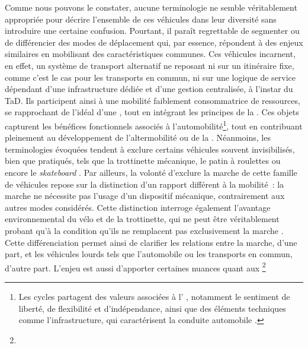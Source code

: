 \begin{refsegment}
Comme nous pouvons le constater, aucune terminologie ne semble véritablement appropriée pour décrire l’ensemble de ces véhicules dans leur diversité sans introduire une certaine confusion. Pourtant, il paraît regrettable de segmenter ou de différencier des modes de déplacement qui, par essence, répondent à des enjeux similaires en mobilisant des caractéristiques communes. Ces véhicules incarnent, en effet, un système de transport alternatif ne reposant ni sur un itinéraire fixe, comme c’est le cas pour les transports en commun, ni sur une logique de service dépendant d’une infrastructure dédiée et d’une gestion centralisée, à l’instar du \acrfull{TaD}. Ils participent ainsi à une mobilité faiblement consommatrice de ressources, se rapprochant de l’idéal d’une  \textcolor{blue}{\autocite[5]{itdp_electric_2019}}, tout en intégrant les principes de la . Ces objets capturent les bénéfices fonctionnels associés à l’automobilité\footnote{
        Les cycles partagent des valeurs associées à l' \textcolor{blue}{\autocites[57-58]{urry_sociology_2000}[28]{urry_system_2004}}, notamment le sentiment de liberté, de flexibilité et d'indépendance, ainsi que des éléments techniques comme l'infrastructure, qui caractérisent la conduite automobile \textcolor{blue}{\autocite[12]{heran_reduction_2001}}.
}, tout en contribuant pleinement au développement de l’altermobilité ou de la  \textcolor{blue}{\autocites[25]{amar_homo_2016}{heran_transition_2018}}. Néanmoins, les terminologies évoquées tendent à exclure certains véhicules souvent invisibilisés, bien que pratiqués, tels que la trottinette mécanique, le patin à roulettes ou encore le \textsl{skateboard} \textcolor{blue}{\autocite[19]{sebban_complementarite_2003}}. Par ailleurs, la volonté d’exclure la marche de cette famille de véhicules repose sur la distinction d’un rapport différent à la mobilité~: la marche ne nécessite pas l’usage d’un dispositif mécanique, contrairement aux autres modes considérés. Cette distinction interroge également l’avantage environnemental du vélo et de la trottinette, qui ne peut être véritablement probant qu'à la condition qu'ils ne remplacent pas exclusivement la marche \textcolor{blue}{\autocite[12]{dezobry_du_2020}}. Cette différenciation permet ainsi de clarifier les relations entre la marche, d’une part, et les véhicules lourds tels que l’automobile ou les transports en commun, d’autre part. L'enjeu est aussi d'apporter certaines nuances quant aux \footnote{
}
\end{refsegment}
